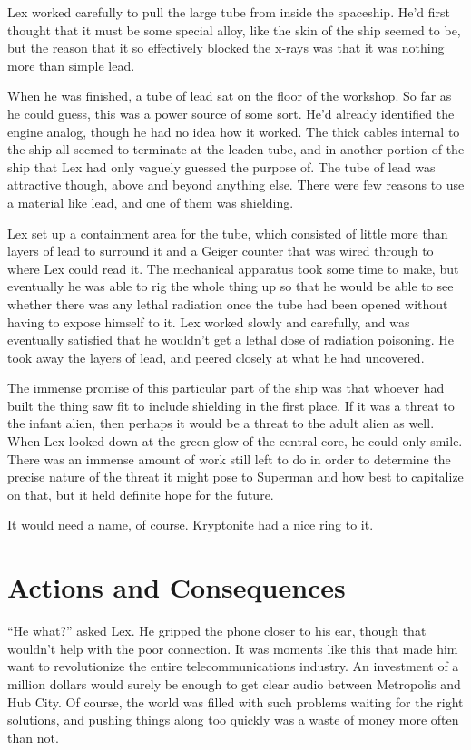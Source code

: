 \documentclass[ebook,12pt]{memoir}
\begin{document}
Lex worked carefully to pull the large tube from inside the spaceship.
He'd first thought that it must be some special alloy, like the skin of
the ship seemed to be, but the reason that it so effectively blocked the
x‐rays was that it was nothing more than simple lead.

When he was finished, a tube of lead sat on the floor of the workshop.
So far as he could guess, this was a power source of some sort. He'd
already identified the engine analog, though he had no idea how it
worked. The thick cables internal to the ship all seemed to terminate at
the leaden tube, and in another portion of the ship that Lex had only
vaguely guessed the purpose of. The tube of lead was attractive though,
above and beyond anything else. There were few reasons to use a material
like lead, and one of them was shielding.

Lex set up a containment area for the tube, which consisted of little
more than layers of lead to surround it and a Geiger counter that was
wired through to where Lex could read it. The mechanical apparatus took
some time to make, but eventually he was able to rig the whole thing up
so that he would be able to see whether there was any lethal radiation
once the tube had been opened without having to expose himself to it.
Lex worked slowly and carefully, and was eventually satisfied that he
wouldn't get a lethal dose of radiation poisoning. He took away the
layers of lead, and peered closely at what he had uncovered.

The immense promise of this particular part of the ship was that whoever
had built the thing saw fit to include shielding in the first place. If
it was a threat to the infant alien, then perhaps it would be a threat
to the adult alien as well. When Lex looked down at the green glow of
the central core, he could only smile. There was an immense amount of
work still left to do in order to determine the precise nature of the
threat it might pose to Superman and how best to capitalize on that, but
it held definite hope for the future.

It would need a name, of course. Kryptonite had a nice ring to it.
\chapter{Actions and Consequences}\label{actions-and-consequences}

``He what?'' asked Lex. He gripped the phone closer to his ear, though
that wouldn't help with the poor connection. It was moments like this
that made him want to revolutionize the entire telecommunications
industry. An investment of a million dollars would surely be enough to
get clear audio between Metropolis and Hub City. Of course, the world
was filled with such problems waiting for the right solutions, and
pushing things along too quickly was a waste of money more often than
not.
\end{document}
